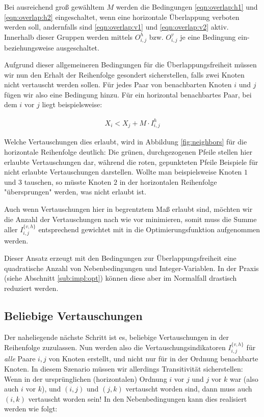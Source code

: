 Bei ausreichend groß gewähltem $M$ werden die Bedingungen \ref{eqn:overlap:h1} und \ref{eqn:overlap:h2} eingeschaltet, wenn eine horizontale Überlappung verboten werden soll, andernfalls sind  \ref{eqn:overlap:v1} und \ref{eqn:overlap:v2} aktiv. Innerhalb dieser Gruppen werden mittels $O^{h}_{i,j}$ bzw. $O^{v}_{i,j}$ je eine Bedingung ein- beziehungsweise ausgeschaltet.

Aufgrund dieser allgemeineren Bedingungen für die Überlappungsfreiheit müssen wir nun den Erhalt der Reihenfolge gesondert sicherstellen, falls zwei Knoten nicht vertauscht werden sollen. Für jedes Paar von benachbarten Knoten $i$ und $j$ fügen wir also eine Bedingung hinzu. Für ein horizontal benachbartes Paar, bei dem $i$ vor $j$ liegt beispielsweise:

\begin{align}
	X_i < X_j + M \cdot I^{h}_{i,j}
\end{align}

Welche Vertauschungen dies erlaubt, wird in Abbildung \ref{fig:neighbors} für die horizontale Reihenfolge deutlich: Die grünen, durchgezogenen Pfeile stellen hier erlaubte Vertauschungen dar, während die roten, gepunkteten Pfeile Beispiele für nicht erlaubte Vertauschungen darstellen. Wollte man beispielsweise Knoten $1$ und $3$ tauschen, so müsste Knoten $2$ in der horizontalen Reihenfolge "übersprungen" werden, was nicht erlaubt ist.

Auch wenn Vertauschungen hier in begrentztem Maß erlaubt sind, möchten wir die Anzahl der Vertauschungen nach wie vor minimieren, somit muss die Summe aller $I^{\{v,h\}}_{i,j}$ entsprechend gewichtet mit in die Optimierungsfunktion aufgenommen werden.

Dieser Ansatz erzeugt mit den Bedingungen zur Überlappungsfreiheit eine quadratische Anzahl von Nebenbedingungen und Integer-Variablen. In der Praxis (siehe Abschnitt \ref{sub:impl:opt}) können diese aber im Normalfall drastisch reduziert werden.

\subsection{Beliebige Vertauschungen}

Der naheliegende nächste Schritt ist es, beliebige Vertauschungen in der Reihenfolge zuzulassen. Nun werden also die Vertauschungsindikatoren $I^{\{v,h\}}_{i,j}$ für \textit{alle} Paare $i,j$ von Knoten erstellt, und nicht nur für in der Ordnung benachbarte Knoten. In diesem Szenario müssen wir allerdings Transitivität sicherstellen: Wenn in der ursprünglichen (horizontalen) Ordnung $i$ vor $j$ und $j$ vor $k$ war (also auch $i$ vor $k$), und $(i,j)$ und $(j,k)$ vertauscht worden sind, dann muss auch $(i,k)$ vertauscht worden sein! In den Nebenbedingungen kann dies realisiert werden wie folgt:

